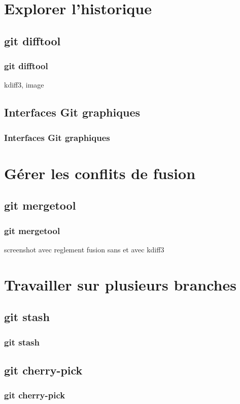 \documentclass[t,11pt]{beamer}
\begin{document}
\section{Explorer l'historique}
\subsection{git difftool}
\begin{frame}
        \frametitle{git difftool}
        kdiff3, image
\end{frame}

\subsection{Interfaces Git graphiques}
\begin{frame}
        \frametitle{Interfaces Git graphiques}
\end{frame}


\section{G\'erer les conflits de fusion}
\subsection{git mergetool}
\begin{frame}
        \frametitle{git mergetool}
        screenshot avec reglement fusion
        sans et avec kdiff3
\end{frame}

\section{Travailler sur plusieurs branches}
\subsection{git stash}
\begin{frame}
        \frametitle{git stash}
\end{frame}

\subsection{git cherry-pick}
\begin{frame}
        \frametitle{git cherry-pick}
\end{frame}
\end{document}
